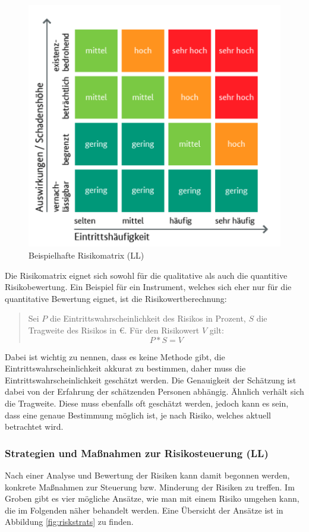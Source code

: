 \documentclass[ThesisDJ.tex]{subfiles}
\begin{document}
\begin{figure}
    \centering
    \includegraphics[width=0.6\linewidth]{risikomatrix.png}
    \caption{Beispielhafte Risikomatrix (LL)}
    \label{fig:riskmatrix}
\end{figure}

Die Risikomatrix eignet sich sowohl für die qualitative als auch die quantitive Risikobewertung. Ein Beispiel für ein Instrument, welches sich eher nur für die quantitative Bewertung eignet, ist die Risikowertberechnung:

\begin{quote}
    Sei $P$ die Eintrittswahrscheinlichkeit des Risikos in Prozent, $S$ die Tragweite des Risikos in €. Für den Risikowert $V$ gilt:
    \[ P * S = V \]  
\end{quote}

Dabei ist wichtig zu nennen, dass es keine Methode gibt, die Eintrittswahrscheinlichkeit akkurat zu bestimmen, daher muss die Eintrittswahrscheinlichkeit geschätzt werden. Die Genauigkeit der Schätzung ist dabei von der Erfahrung der schätzenden Personen abhängig. Ähnlich verhält sich die Tragweite. Diese muss ebenfalls oft geschätzt werden, jedoch kann es sein, dass eine genaue Bestimmung möglich ist, je nach Risiko, welches aktuell betrachtet wird.

\subsubsection{Strategien und Maßnahmen zur Risikosteuerung (LL)}
Nach einer Analyse und Bewertung der Risiken kann damit begonnen werden, konkrete Maßnahmen zur Steuerung bzw. Minderung der Risiken zu treffen. Im Groben gibt es vier mögliche Ansätze, wie man mit einem Risiko umgehen kann, die im Folgenden näher behandelt werden. Eine Übersicht der Ansätze ist in Abbildung \ref{fig:riskstrats}\cite[(Section 2)S.~25]{cicek2022risikomanagement} zu finden.
\end{document}
